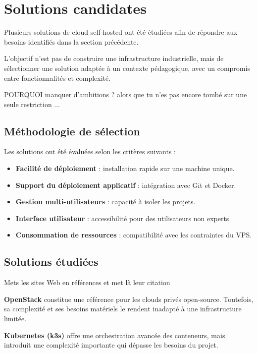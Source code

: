 \documentclass{rapportClass} %
\begin{document}
\section{Solutions candidates}

Plusieurs solutions de cloud self-hosted ont été étudiées afin de
répondre aux besoins identifiés dans la section précédente.

L’objectif n’est pas de construire une infrastructure industrielle,
mais de sélectionner une solution adaptée à un contexte pédagogique,
avec un compromis entre fonctionnalités et complexité.

{\color{red} POURQUOI manquer d'ambitions ? alors que tu n'es pas encore tombé sur une seule restriction ...}

\subsection{Méthodologie de sélection}

Les solutions ont été évaluées selon les critères suivants :

\begin{itemize}[label=$\bullet$] 
\item \textbf{Facilité de déploiement} : installation rapide sur une machine unique.
\item \textbf{Support du déploiement applicatif} : intégration avec Git et Docker.
\item \textbf{Gestion multi-utilisateurs} : capacité à isoler les projets.
\item \textbf{Interface utilisateur} : accessibilité pour des utilisateurs non experts.
\item \textbf{Consommation de ressources} : compatibilité avec les contraintes du VPS.
\end{itemize}

\subsection{Solutions étudiées}
{\color{red} Mets les sites Web en références et met là leur citation}

\textbf{OpenStack} constitue une référence pour les clouds privés
open-source. Toutefois, sa complexité et ses besoins matériels le
rendent inadapté à une infrastructure limitée.

\smallskip
\textbf{Kubernetes (k3s)} offre une orchestration avancée des conteneurs,
mais introduit une complexité importante qui dépasse les besoins du projet.
\end{document}
